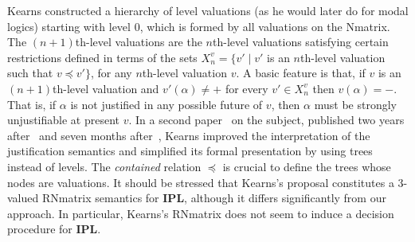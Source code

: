 \documentclass[12pt]{article}
\newcommand{\ipl}{\ensuremath{\mathbf{IPL}}}
\begin{document}
Kearns constructed a hierarchy of level valuations (as he would later do for modal logics) starting with level 0, which is formed by all valuations on the Nmatrix.
The $(n+1)$th-level valuations are the $n$th-level valuations satisfying certain restrictions defined in terms of the sets $X_n^v=\{v' \mid v'$ is an $n$th-level valuation such that $v \preceq v' \}$, for any $n$th-level valuation $v$. A basic feature is that, if $v$ is an $(n + 1)$th-level valuation and $v'(\alpha) \neq +$ for every $v' \in X_n^v$ then $v(\alpha)=-$. That is, if $\alpha$ is not justified in any possible future of $v$, then $\alpha$ must be strongly unjustifiable at present $v$.
In a second paper~\cite{kearns:IPL:81} on the subject, published two years after~\cite{kearns:78} and seven months after~\cite{kearns_modal_1981}, Kearns improved the interpretation of the justification semantics and simplified its formal presentation by using trees instead of levels.
The {\em contained} relation $\preceq$ is crucial to define the trees whose nodes are valuations. It should be stressed that Kearns's proposal constitutes a 3-valued RNmatrix semantics for \ipl, although it differs significantly from our approach. In particular, Kearns's RNmatrix does not seem to induce a decision procedure for \ipl.\\[1mm]
\end{document}
